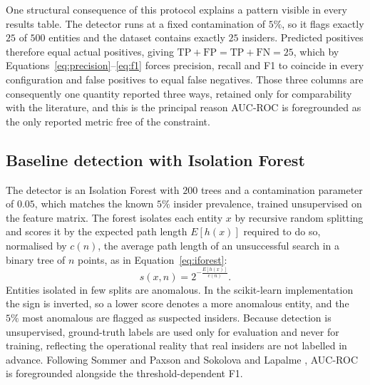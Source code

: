 \documentclass[10pt,a4paper]{article}
\begin{document}
One structural consequence of this protocol explains a pattern visible in every results table. The detector runs at a fixed contamination of $5\%$, so it flags exactly $25$ of $500$ entities and the dataset contains exactly $25$ insiders. Predicted positives therefore equal actual positives, giving $\text{TP}+\text{FP}=\text{TP}+\text{FN}=25$, which by Equations~\eqref{eq:precision}--\eqref{eq:f1} forces precision, recall and F1 to coincide in every configuration and false positives to equal false negatives. Those three columns are consequently one quantity reported three ways, retained only for comparability with the literature, and this is the principal reason AUC-ROC is foregrounded as the only reported metric free of the constraint.

\subsection{Baseline detection with Isolation Forest}
The detector is an Isolation Forest \cite{isoforest2008} with $200$ trees and a contamination parameter of $0.05$, which matches the known $5\%$ insider prevalence, trained unsupervised on the feature matrix. The forest isolates each entity $x$ by recursive random splitting and scores it by the expected path length $E[h(x)]$ required to do so, normalised by $c(n)$, the average path length of an unsuccessful search in a binary tree of $n$ points, as in Equation~\eqref{eq:iforest}:
\begin{equation}
\label{eq:iforest}
s(x,n)=2^{-\frac{E[h(x)]}{c(n)}}.
\end{equation}
Entities isolated in few splits are anomalous. In the scikit-learn implementation the sign is inverted, so a lower score denotes a more anomalous entity, and the $5\%$ most anomalous are flagged as suspected insiders. Because detection is unsupervised, ground-truth labels are used only for evaluation and never for training, reflecting the operational reality that real insiders are not labelled in advance. Following Sommer and Paxson \cite{sommer2010} and Sokolova and Lapalme \cite{sokolova2009}, AUC-ROC is foregrounded alongside the threshold-dependent F1.
\end{document}
